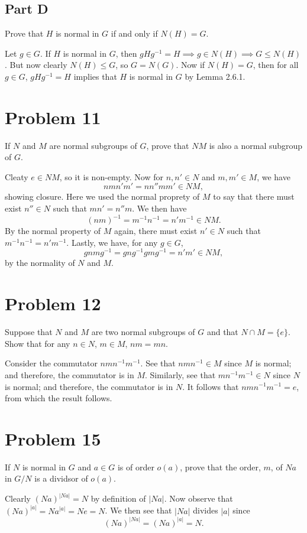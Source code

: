 \documentclass[12pt]{article}
\begin{document}
\subsection*{Part D}

Prove that $H$ is normal in $G$ if and only if $N(H)=G$.

Let $g\in G$.  If $H$ is normal in $G$, then $gHg^{-1}=H\implies g\in N(H)\implies G\leq N(H)$.
But now clearly $N(H)\leq G$, so $G=N(G)$.  Now if $N(H)=G$, then
for all $g\in G$, $gHg^{-1}=H$ implies that $H$ is normal in $G$ by Lemma 2.6.1.

\section*{Problem 11}

If $N$ and $M$ are normal subgroups of $G$, prove that $NM$ is also a normal subgroup of $G$.

Cleaty $e\in NM$, so it is non-empty.  Now for $n,n'\in N$ and $m,m'\in M$, we have
\begin{equation*}
nmn'm'=nn''mm'\in NM,
\end{equation*}
showing closure.  Here we used the normal proprety of $M$ to say that
there must exist $n''\in N$ such that $mn'=n''m$.
We then have
\begin{equation*}
(nm)^{-1}=m^{-1}n^{-1}=n'm^{-1}\in NM.
\end{equation*}
By the normal property of $M$ again, there must exist $n'\in N$
such that $m^{-1}n^{-1}=n'm^{-1}$.
Lastly, we have, for any $g\in G$,
\begin{equation*}
gnmg^{-1}=gng^{-1}gmg^{-1}=n'm'\in NM,
\end{equation*}
by the normality of $N$ and $M$.

\section*{Problem 12}

Suppose that $N$ and $M$ are two normal subgroups of $G$ and that
$N\cap M=\{e\}$.  Show that for any $n\in N$, $m\in M$, $nm=mn$.

Consider the commutator $nmn^{-1}m^{-1}$.  See that $nmn^{-1}\in M$
since $M$ is normal; and therefore, the commutator is in $M$.  Similarly,
see that $mn^{-1}m^{-1}\in N$ since $N$ is normal; and therefore, the
commutator is in $N$.  It follows that $nmn^{-1}m^{-1}=e$, from which
the result follows.

\section*{Problem 15}

If $N$ is normal in $G$ and $a\in G$ is of order $o(a)$, prove that the order,
$m$, of $Na$ in $G/N$ is a dividsor of $o(a)$.

Clearly $(Na)^{|Na|}=N$ by definition of $|Na|$.
Now observe that $(Na)^{|a|}=Na^{|a|}=Ne=N$.
We then see that $|Na|$ divides $|a|$ since
\begin{equation*}
(Na)^{|Na|}=(Na)^{|a|}=N.
\end{equation*}
\end{document}
